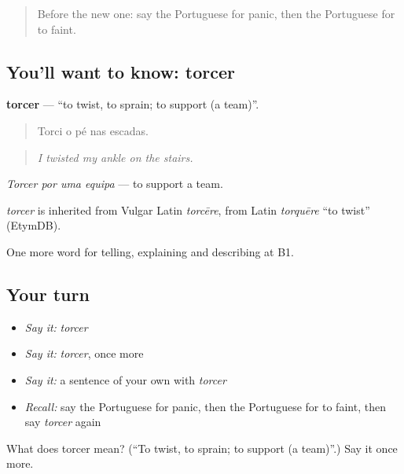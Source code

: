 \label{lesson:PT-C308-torcer}



\begin{quote}
Before the new one: say the Portuguese for panic, then the Portuguese for to faint.
\end{quote}

\subsection*{You'll want to know: torcer}
\textbf{torcer} — \textquotedblleft{}to twist, to sprain; to support (a team)\textquotedblright{}.

\begin{quote}
Torci o pé nas escadas.
\end{quote}

\begin{quote}
\emph{I twisted my ankle on the stairs.}
\end{quote}

\emph{Torcer por uma equipa} — to support a team.

\begin{cousinweb}
\emph{torcer} is inherited from Vulgar Latin \emph{torcēre}, from Latin \emph{torquēre} \textquotedblleft{}to twist\textquotedblright{} (EtymDB).
\end{cousinweb}

\begin{grammarlens}[title={What you've built}]
One more word for telling, explaining and describing at B1.
\end{grammarlens}

\subsection*{Your turn}
\begin{itemize}
\raggedright
  \item \emph{Say it:} \emph{torcer}
  \item \emph{Say it:} \emph{torcer}, once more
  \item \emph{Say it:} a sentence of your own with \emph{torcer}
  \item \emph{Recall:} say the Portuguese for panic, then the Portuguese for to faint, then say \emph{torcer} again
\end{itemize}

\begin{tcolorbox}[breakable,colback=teal!4,colframe=teal!35!black,title={Before you move on}]
What does torcer mean? (\textquotedblleft{}To twist, to sprain; to support (a team)\textquotedblright{}.) Say it once more.
\end{tcolorbox}
